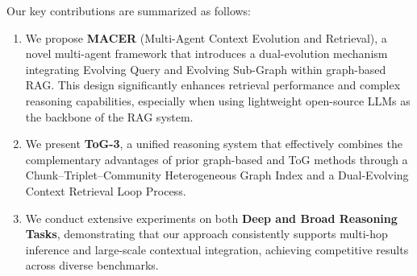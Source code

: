 Our key contributions are summarized as follows:

\begin{enumerate}
\item We propose \textbf{MACER} (Multi-Agent Context Evolution and Retrieval), a novel multi-agent framework that introduces a dual-evolution mechanism integrating Evolving Query and Evolving Sub-Graph within graph-based RAG. 
This design significantly enhances retrieval performance and complex reasoning capabilities, especially when using lightweight open-source LLMs as the backbone of the RAG system.
\item We present \textbf{ToG-3}, a unified reasoning system that effectively combines the complementary advantages of prior graph-based and ToG methods through a Chunk–Triplet–Community Heterogeneous Graph Index and a Dual-Evolving Context Retrieval Loop Process.
\item We conduct extensive experiments on both \textbf{Deep and Broad Reasoning Tasks}, demonstrating that our approach consistently supports multi-hop inference and large-scale contextual integration, achieving competitive results across diverse benchmarks.
\end{enumerate}





